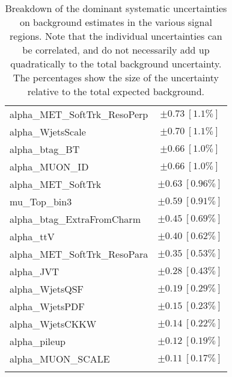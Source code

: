 \begin{table}
\begin{center}
\begin{tabular*}{\textwidth}{@{\extracolsep{\fill}}lc}
alpha\_MET\_SoftTrk\_ResoPerp         & $\pm 0.73\ [1.1\%] $       \\
alpha\_WjetsScale         & $\pm 0.70\ [1.1\%] $       \\
alpha\_btag\_BT         & $\pm 0.66\ [1.0\%] $       \\
alpha\_MUON\_ID         & $\pm 0.66\ [1.0\%] $       \\
alpha\_MET\_SoftTrk         & $\pm 0.63\ [0.96\%] $       \\
mu\_Top\_bin3         & $\pm 0.59\ [0.91\%] $       \\
alpha\_btag\_ExtraFromCharm         & $\pm 0.45\ [0.69\%] $       \\
alpha\_ttV         & $\pm 0.40\ [0.62\%] $       \\
alpha\_MET\_SoftTrk\_ResoPara         & $\pm 0.35\ [0.53\%] $       \\
alpha\_JVT         & $\pm 0.28\ [0.43\%] $       \\
alpha\_WjetsQSF         & $\pm 0.19\ [0.29\%] $       \\
alpha\_WjetsPDF         & $\pm 0.15\ [0.23\%] $       \\
alpha\_WjetsCKKW         & $\pm 0.14\ [0.22\%] $       \\
alpha\_pileup         & $\pm 0.12\ [0.19\%] $       \\
alpha\_MUON\_SCALE         & $\pm 0.11\ [0.17\%] $       \\
\noalign{\smallskip}\hline\noalign{\smallskip}
\end{tabular*}
\end{center}
\caption[Breakdown of uncertainty on background estimates]{
Breakdown of the dominant systematic uncertainties on background estimates in the various signal regions.
Note that the individual uncertainties can be correlated, and do not necessarily add up quadratically to 
the total background uncertainty. The percentages show the size of the uncertainty relative to the total expected background.
\label{table.results.bkgestimate.uncertainties.STCREM_cuts}}
\end{table}
%